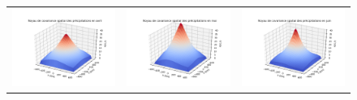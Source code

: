 \documentclass[a4paper,11pt]{article}
\numberwithin{equation}{section}
\begin{document}
\begin{figure}[H]
\begin{tabular}{ccc}
	\includegraphics[scale=0.34]{images/kernel_precip_m4.png} & \includegraphics[scale=0.34]{images/kernel_precip_m5.png} & \includegraphics[scale=0.34]{images/kernel_precip_m6.png} \\
\end{tabular}


\end{figure}
\end{document}
